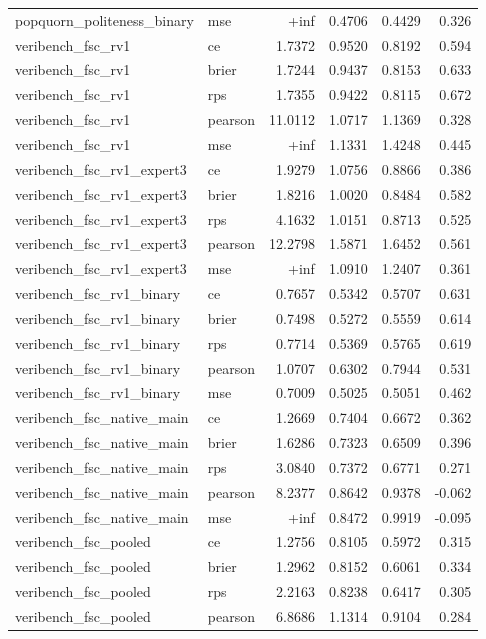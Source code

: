 \begin{tabular}{llrrrr}
popquorn_politeness_binary & mse & +inf & 0.4706 & 0.4429 & 0.326 \\
veribench_fsc_rv1 & ce & 1.7372 & 0.9520 & 0.8192 & 0.594 \\
veribench_fsc_rv1 & brier & 1.7244 & 0.9437 & 0.8153 & 0.633 \\
veribench_fsc_rv1 & rps & 1.7355 & 0.9422 & 0.8115 & 0.672 \\
veribench_fsc_rv1 & pearson & 11.0112 & 1.0717 & 1.1369 & 0.328 \\
veribench_fsc_rv1 & mse & +inf & 1.1331 & 1.4248 & 0.445 \\
veribench_fsc_rv1_expert3 & ce & 1.9279 & 1.0756 & 0.8866 & 0.386 \\
veribench_fsc_rv1_expert3 & brier & 1.8216 & 1.0020 & 0.8484 & 0.582 \\
veribench_fsc_rv1_expert3 & rps & 4.1632 & 1.0151 & 0.8713 & 0.525 \\
veribench_fsc_rv1_expert3 & pearson & 12.2798 & 1.5871 & 1.6452 & 0.561 \\
veribench_fsc_rv1_expert3 & mse & +inf & 1.0910 & 1.2407 & 0.361 \\
veribench_fsc_rv1_binary & ce & 0.7657 & 0.5342 & 0.5707 & 0.631 \\
veribench_fsc_rv1_binary & brier & 0.7498 & 0.5272 & 0.5559 & 0.614 \\
veribench_fsc_rv1_binary & rps & 0.7714 & 0.5369 & 0.5765 & 0.619 \\
veribench_fsc_rv1_binary & pearson & 1.0707 & 0.6302 & 0.7944 & 0.531 \\
veribench_fsc_rv1_binary & mse & 0.7009 & 0.5025 & 0.5051 & 0.462 \\
veribench_fsc_native_main & ce & 1.2669 & 0.7404 & 0.6672 & 0.362 \\
veribench_fsc_native_main & brier & 1.6286 & 0.7323 & 0.6509 & 0.396 \\
veribench_fsc_native_main & rps & 3.0840 & 0.7372 & 0.6771 & 0.271 \\
veribench_fsc_native_main & pearson & 8.2377 & 0.8642 & 0.9378 & -0.062 \\
veribench_fsc_native_main & mse & +inf & 0.8472 & 0.9919 & -0.095 \\
veribench_fsc_pooled & ce & 1.2756 & 0.8105 & 0.5972 & 0.315 \\
veribench_fsc_pooled & brier & 1.2962 & 0.8152 & 0.6061 & 0.334 \\
veribench_fsc_pooled & rps & 2.2163 & 0.8238 & 0.6417 & 0.305 \\
veribench_fsc_pooled & pearson & 6.8686 & 1.1314 & 0.9104 & 0.284 \\

\end{tabular}
